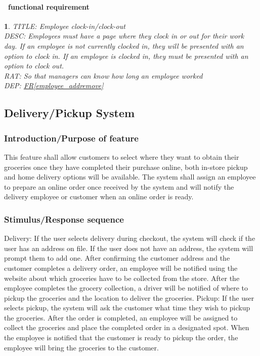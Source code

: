 \documentclass{scrreprt}
\theoremstyle{funreq}
\newtheorem{funreq}{}
\newcommand*{\reqref}[1]{\hyperref[#1]{FR\ref*{#1}}}
\begin{document}
	\paragraph[]{\Subsectionname ~functional requirement }
	\begin{funreq}
		\label{employee_clock}
		TITLE: Employee clock-in/clock-out\\
		DESC: Employees must have a page where they clock in or out for their work day.  If an employee is not currently clocked in, they will be presented with an option to clock in.  If an employee is clocked in, they must be presented with an option to clock out.\\
		RAT: So that managers can know how long an employee worked\\
		DEP: \reqref{employee_addremove}
	\end{funreq}
	
	\subsection{Delivery/Pickup System}
	\subsubsection{Introduction/Purpose of feature}
    This feature shall allow customers to select where they want to obtain their groceries once they have completed their purchase online, both in-store pickup and home delivery options will be available. The system shall assign an employee to prepare an online order once received by the system and will notify the delivery employee or customer when an online order is ready.

	\subsubsection{Stimulus/Response sequence}
	Delivery: If the user selects delivery during checkout, the system will check if the user has an address on file.  If the user does not have an address, the system will prompt them to add one.  After confirming the customer address and the customer completes a delivery order, an employee will be notified using the website about which groceries have to be collected from the store.  After the employee completes the grocery collection, a driver will be notified of where to pickup the groceries and the location to deliver the groceries.
	Pickup: If the user selects pickup, the system will ask the customer what time they wish to pickup the groceries.  After the order is completed, an employee will be assigned to collect the groceries and place the completed order in a designated spot.  When the employee is notified that the customer is ready to pickup the order, the employee will bring the groceries to the customer.
	\raggedbottom
	
\end{document}
